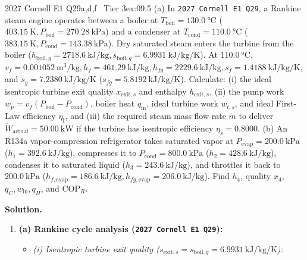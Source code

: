 \begin{workedexample}{2027 Cornell E1 Q29a,d,f \textbar\ Tier 3}{ex:09.5}
(a) In \texttt{2027 Cornell E1 Q29}, a Rankine steam engine operates between a boiler at $T_{\mathrm{boil}} = \SI{130.0}{\celsius}$ ($\SI{403.15}{\kelvin}, P_{\mathrm{boil}} = \SI{270.28}{\kilo\pascal}$) and a condenser at $T_{\mathrm{cond}} = \SI{110.0}{\celsius}$ ($\SI{383.15}{\kelvin}, P_{\mathrm{cond}} = \SI{143.38}{\kilo\pascal}$). Dry saturated steam enters the turbine from the boiler ($h_{\mathrm{boil},g} = \SI{2718.6}{\kilo\joule\per\kilogram}, s_{\mathrm{boil},g} = \SI{6.9931}{\kilo\joule\per\kilogram\per\kelvin}$). At $\SI{110.0}{\celsius}$, $v_f = \SI{0.001052}{\cubic\meter\per\kilogram}, h_f = \SI{461.29}{\kilo\joule\per\kilogram}, h_{fg} = \SI{2229.6}{\kilo\joule\per\kilogram}, s_f = \SI{1.4188}{\kilo\joule\per\kilogram\per\kelvin}$, and $s_g = \SI{7.2380}{\kilo\joule\per\kilogram\per\kelvin}$ ($s_{fg} = \SI{5.8192}{\kilo\joule\per\kilogram\per\kelvin}$). Calculate: (i) the ideal isentropic turbine exit quality $x_{\mathrm{exit},s}$ and enthalpy $h_{\mathrm{exit},s}$, (ii) the pump work $w_p = v_f(P_{\mathrm{boil}} - P_{\mathrm{cond}})$, boiler heat $q_{\mathrm{in}}$, ideal turbine work $w_{t,s}$, and ideal First-Law efficiency $\eta_{\mathrm{I}}$, and (iii) the required steam mass flow rate $\dot{m}$ to deliver $\dot{W}_{\mathrm{actual}} = \SI{50.00}{\kilo\watt}$ if the turbine has isentropic efficiency $\eta_s = 0.8000$.
(b) An R134a vapor-compression refrigerator takes saturated vapor at $P_{\mathrm{evap}} = \SI{200.0}{\kilo\pascal}$ ($h_1 = \SI{392.6}{\kilo\joule\per\kilogram}$), compresses it to $P_{\mathrm{cond}} = \SI{800.0}{\kilo\pascal}$ ($h_2 = \SI{428.6}{\kilo\joule\per\kilogram}$), condenses it to saturated liquid ($h_3 = \SI{243.6}{\kilo\joule\per\kilogram}$), and throttles it back to $\SI{200.0}{\kilo\pascal}$ ($h_{f,\mathrm{evap}} = \SI{186.6}{\kilo\joule\per\kilogram}, h_{fg,\mathrm{evap}} = \SI{206.0}{\kilo\joule\per\kilogram}$). Find $h_4$, quality $x_4$, $q_C, w_{\mathrm{in}}, q_H$, and $\mathrm{COP}_R$.
\par\smallskip\noindent
\textbf{Solution.}
\begin{enumerate}
  \item \textbf{(a) Rankine cycle analysis (\texttt{2027 Cornell E1 Q29}):}
  \begin{itemize}
    \item \emph{(i) Isentropic turbine exit quality ($s_{\mathrm{exit},s} = s_{\mathrm{boil},g} = \SI{6.9931}{\kilo\joule\per\kilogram\per\kelvin}$):}

\end{itemize}
\end{enumerate}
\end{workedexample}
